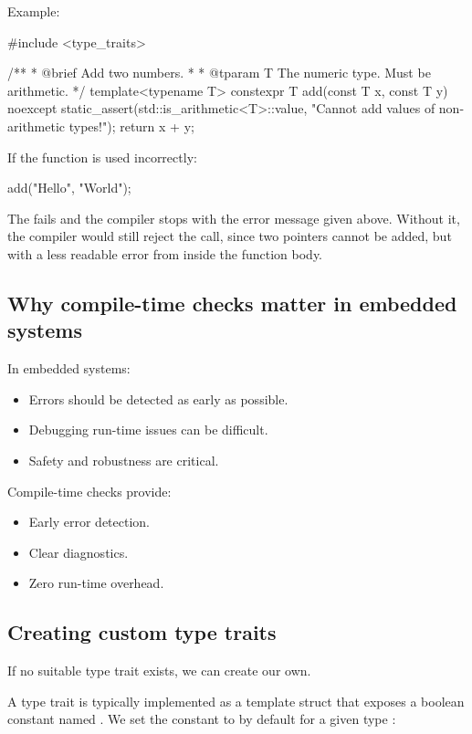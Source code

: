 Example:

\begin{cppcode}
#include <type_traits>

/**
 * @brief Add two numbers.
 *
 * @tparam T The numeric type. Must be arithmetic.
 */
template<typename T>
constexpr T add(const T x, const T y) noexcept
{
    static_assert(std::is_arithmetic<T>::value, "Cannot add values of non-arithmetic types!");
    return x + y;
}
\end{cppcode}

\noindent If the function is used incorrectly:

\begin{cppcode}
add("Hello", "World");
\end{cppcode}

\noindent The  fails and the compiler stops with the error message given
above. Without it, the compiler would still reject the call, since two pointers cannot be added,
but with a less readable error from inside the function body.

\subsection{Why compile-time checks matter in embedded systems}
\label{c5:sec:whycompiletime}
In embedded systems:
\begin{itemize}
  \item Errors should be detected as early as possible.
  \item Debugging run-time issues can be difficult.
  \item Safety and robustness are critical.
\end{itemize}
Compile-time checks provide:
\begin{itemize}
  \item Early error detection.
  \item Clear diagnostics.
  \item Zero run-time overhead.
\end{itemize}

\subsection{Creating custom type traits}
\label{c5:sec:customtraits}
If no suitable type trait exists, we can create our own.

A type trait is typically implemented as a template struct that exposes a boolean constant named
. We set the constant  to  by default for a given type
:

